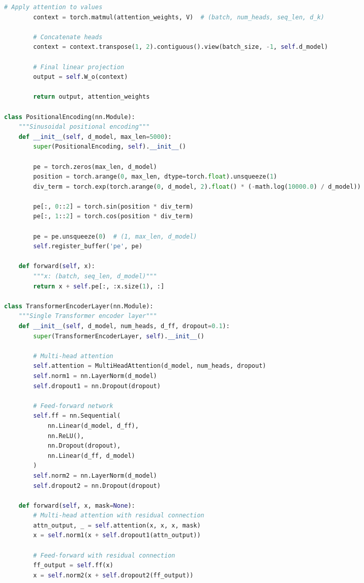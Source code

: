 \documentclass[8pt,landscape]{article}
\begin{document}
\begin{multicols}{3}
\begin{lstlisting}[language=Python]
        # Apply attention to values
        context = torch.matmul(attention_weights, V)  # (batch, num_heads, seq_len, d_k)

        # Concatenate heads
        context = context.transpose(1, 2).contiguous().view(batch_size, -1, self.d_model)

        # Final linear projection
        output = self.W_o(context)

        return output, attention_weights

class PositionalEncoding(nn.Module):
    """Sinusoidal positional encoding"""
    def __init__(self, d_model, max_len=5000):
        super(PositionalEncoding, self).__init__()

        pe = torch.zeros(max_len, d_model)
        position = torch.arange(0, max_len, dtype=torch.float).unsqueeze(1)
        div_term = torch.exp(torch.arange(0, d_model, 2).float() * (-math.log(10000.0) / d_model))

        pe[:, 0::2] = torch.sin(position * div_term)
        pe[:, 1::2] = torch.cos(position * div_term)

        pe = pe.unsqueeze(0)  # (1, max_len, d_model)
        self.register_buffer('pe', pe)

    def forward(self, x):
        """x: (batch, seq_len, d_model)"""
        return x + self.pe[:, :x.size(1), :]

class TransformerEncoderLayer(nn.Module):
    """Single Transformer encoder layer"""
    def __init__(self, d_model, num_heads, d_ff, dropout=0.1):
        super(TransformerEncoderLayer, self).__init__()

        # Multi-head attention
        self.attention = MultiHeadAttention(d_model, num_heads, dropout)
        self.norm1 = nn.LayerNorm(d_model)
        self.dropout1 = nn.Dropout(dropout)

        # Feed-forward network
        self.ff = nn.Sequential(
            nn.Linear(d_model, d_ff),
            nn.ReLU(),
            nn.Dropout(dropout),
            nn.Linear(d_ff, d_model)
        )
        self.norm2 = nn.LayerNorm(d_model)
        self.dropout2 = nn.Dropout(dropout)

    def forward(self, x, mask=None):
        # Multi-head attention with residual connection
        attn_output, _ = self.attention(x, x, x, mask)
        x = self.norm1(x + self.dropout1(attn_output))

        # Feed-forward with residual connection
        ff_output = self.ff(x)
        x = self.norm2(x + self.dropout2(ff_output))


\end{lstlisting}
\end{multicols}
\end{document}
